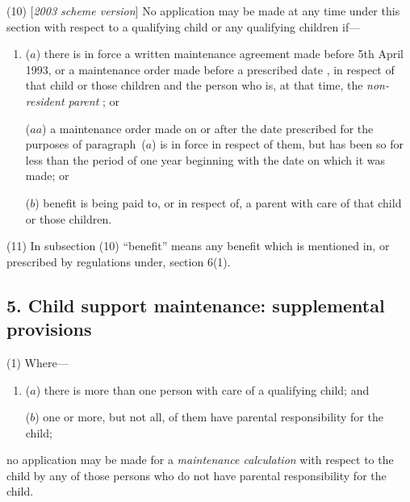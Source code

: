 \documentclass[12pt,a4paper]{article}
\begin{document}
(10) [\emph{2003 scheme version}] No application may be made at any time under this section with respect to a qualifying child or any qualifying children if—
\begin{enumerate}\item[]
($a$) there is in force a written maintenance agreement made before 5th April 1993, or a maintenance order
made before a prescribed date%
, in respect of that child or those children and the person who is, at that time, the 
\emph{non-resident parent}%
; or

($aa$) a maintenance order made on or after the date prescribed for the purposes of paragraph~($a$)  is in force in respect of them, but has been so for less than the period of one year beginning with the date on which it was made; or

($b$) benefit is being paid to, or in respect of, a parent with care of that child or 
those children.
\end{enumerate}

(11) In subsection (10) “benefit” means any benefit which is mentioned in, or prescribed by regulations under, section 6(1).



\subsection{5. Child support maintenance: supplemental provisions}

(1) Where—
\begin{enumerate}\item[]
($a$) there is more than one person with care of a qualifying child; and

($b$) one or more, but not all, of them have parental responsibility for 
the child;
\end{enumerate}
no application may be made for a 
\emph{maintenance calculation}  %
with respect to the child by any of those persons who do not have parental responsibility for 
the child.
\end{document}
